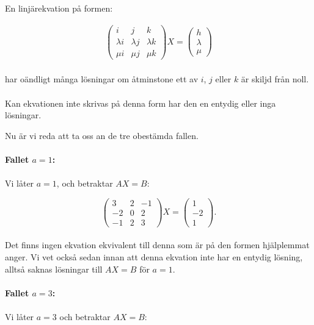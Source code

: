 \documentclass{article}
\begin{document}
\begin{mdframed}
En linjärekvation på formen:

\begin{gather*}
  \begin{pmatrix}
    i & j & k \\
    \lambda i & \lambda j & \lambda k \\
    \mu i & \mu j & \mu k
  \end{pmatrix}
  X =
  \begin{pmatrix}
    h \\ \lambda \\ \mu
  \end{pmatrix}
\end{gather*}
\\
har oändligt många lösningar om åtminstone ett av $i$, $j$ eller $k$ är skiljd från noll.
\\
\\
Kan ekvationen inte skrivas på denna form har den en entydig eller inga lösningar.
\end{mdframed}

\noindent Nu är vi reda att ta oss an de tre obestämda fallen.
\\
\\
\textbf{Fallet $a = 1$:}
\\
\\
Vi låter $a = 1$, och betraktar $AX = B$:

\begin{equation*}
  \begin{pmatrix}
    3 & 2 & -1\\
    -2 & 0 & 2\\
    -1 & 2 & 3
  \end{pmatrix}
  X =
  \begin{pmatrix}
    1 \\ -2 \\ 1
  \end{pmatrix}\text{.}
\end{equation*}
\\
Det finns ingen ekvation ekvivalent till denna som är på den formen hjälplemmat anger. Vi vet också sedan innan att denna ekvation inte har en entydig lösning, alltså saknas lösningar till $AX = B$ för $a = 1$.
\\
\\
\textbf{Fallet $a = 3$:}
\\
\\
Vi låter $a = 3$ och betraktar $AX = B$:
\end{document}
